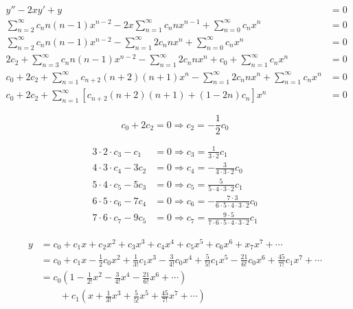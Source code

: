 \documentclass{article}
\begin{document}
\begin{align*}
  y'' -  2 x y' + y                                                                                                               & = 0 \\
  \sum_{n = 2}^\infty c_n n (n - 1) x^{n - 2} - 2 x \sum_{n = 1}^\infty c_n n x^{n - 1} + \sum_{n = 0}^\infty c_n x^n             & = 0 \\
  \sum_{n = 2}^\infty c_n n (n - 1) x^{n - 2} - \sum_{n = 1}^\infty 2 c_n n x^n + \sum_{n = 0}^\infty c_n x^n                     & = 0 \\
  2 c_2 + \sum_{n = 3}^\infty c_n n (n - 1) x^{n - 2} - \sum_{n = 1}^\infty 2 c_n n x^n + c_0 + \sum_{n = 1}^\infty c_n x^n       & = 0 \\
  c_0 + 2 c_2 + \sum_{n = 1}^\infty c_{n + 2} (n + 2) (n + 1) x^n - \sum_{n = 1}^\infty 2 c_n n x^n + \sum_{n = 1}^\infty c_n x^n & = 0 \\
  c_0 + 2 c_2 + \sum_{n = 1}^\infty [c_{n + 2} (n + 2) (n + 1) + (1 - 2 n) c_n] x^n                                               & = 0
\end{align*}

\[c_0 + 2 c_2 = 0 \Rightarrow c_2 = -\frac{1}{2} c_0\]

\begin{align*}
  3 \cdot 2 \cdot c_3 - c_1   & = 0 \Rightarrow c_3 = \frac{1}{3 \cdot 2} c_1                                         \\
  4 \cdot 3 \cdot c_4 - 3 c_2 & = 0 \Rightarrow c_4 = -\frac{3}{4 \cdot 3 \cdot 2} c_0                                \\
  5 \cdot 4 \cdot c_5 - 5 c_3 & = 0 \Rightarrow c_5 = \frac{5}{5 \cdot 4 \cdot 3 \cdot 2} c_1                         \\
  6 \cdot 5 \cdot c_6 - 7 c_4 & = 0 \Rightarrow c_6 = -\frac{7 \cdot 3}{6 \cdot 5 \cdot 4 \cdot 3 \cdot 2} c_0        \\
  7 \cdot 6 \cdot c_7 - 9 c_5 & = 0 \Rightarrow c_7 = \frac{9 \cdot 5}{7 \cdot 6 \cdot 5 \cdot 4 \cdot 3 \cdot 2} c_1
\end{align*}

\begin{align*}
  y & = c_0 + c_1 x + c_2 x^2 + c_3 x^3 + c_4 x^4 + c_5 x^5 + c_6 x^6 + x_7 x^7 + \cdots                                                                                \\
    & = c_0 + c_1 x - \frac{1}{2} c_0 x^2 + \frac{1}{3!} c_1 x^3 - \frac{3}{4!} c_0 x^4 + \frac{5}{5!} c_1 x^5 - \frac{21}{6!} c_0 x^6 + \frac{45}{7!} c_1 x^7 + \cdots \\
    & = c_0 \left( 1 - \frac{1}{2!} x^2 - \frac{3}{4!} x^4 - \frac{21}{6!} x^6 + \cdots \right)                                                                         \\
    & \qquad + c_1 \left( x + \frac{1}{3!} x^3 + \frac{5}{5!} x^5 + \frac{45}{7!} x^7 + \cdots \right)
\end{align*}
\end{document}
